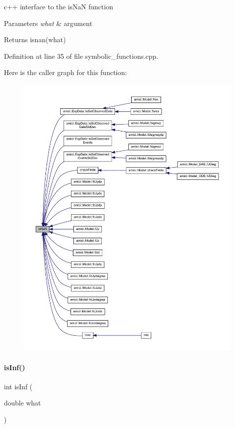 c++ interface to the is\+NaN function


\begin{DoxyParams}{Parameters}
{\em what} & argument \\
\hline
\end{DoxyParams}
\begin{DoxyReturn}{Returns}
isnan(what) 
\end{DoxyReturn}


Definition at line 35 of file symbolic\+\_\+functions.\+cpp.

Here is the caller graph for this function\+:
\nopagebreak
\begin{figure}[H]
\begin{center}
\leavevmode
\includegraphics[width=350pt]{namespaceamici_a7452657cd5f8d541f9e823df5e82c516_icgraph}
\end{center}
\end{figure}
\mbox{\label{namespaceamici_a10c0a2eb43575a155a34f5bb280f7973}} 
\paragraph{\texorpdfstring{is\+Inf()}{isInf()}}
{\footnotesize\ttfamily int is\+Inf (\begin{DoxyParamCaption}\item[{double}]{what }\end{DoxyParamCaption})}

